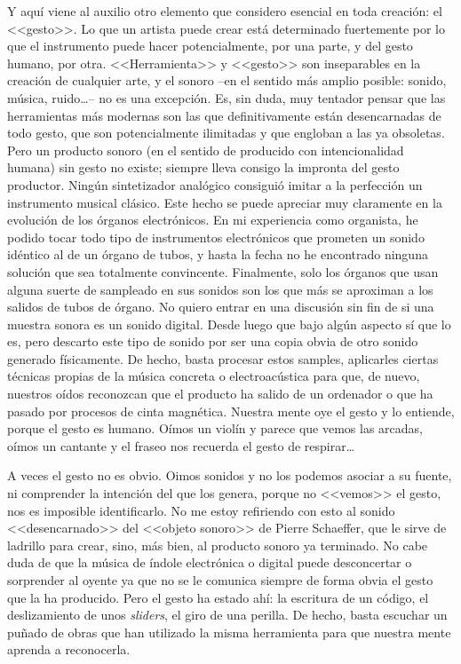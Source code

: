 Y aquí viene al auxilio otro elemento que considero esencial en toda creación: el <<gesto>>. Lo que un artista puede crear está determinado fuertemente por lo que el instrumento puede hacer potencialmente, por una parte, y del gesto humano, por  otra. <<Herramienta>> y <<gesto>> son inseparables en la creación de cualquier arte, y el sonoro --en el sentido más amplio posible: sonido, música, ruido\dots-- no es una excepción. Es, sin duda, muy tentador pensar que las herramientas más modernas son las que definitivamente están desencarnadas de todo gesto, que son potencialmente ilimitadas y que engloban a las ya obsoletas. Pero un producto sonoro (en el sentido de producido con intencionalidad humana) sin gesto no existe; siempre lleva consigo la impronta del gesto productor. Ningún sintetizador analógico consiguió imitar a la perfección un instrumento musical clásico. Este hecho se puede apreciar muy claramente en la evolución de los órganos electrónicos. En mi experiencia como organista, he podido tocar todo tipo de instrumentos electrónicos que prometen un sonido idéntico al de un órgano de tubos, y hasta la fecha no he encontrado ninguna solución que sea totalmente convincente. Finalmente, solo los órganos que usan alguna suerte de sampleado en sus sonidos son los que más se aproximan a los  salidos de tubos de órgano. No quiero entrar en una discusión sin fin de si una muestra sonora es un sonido digital. Desde luego que bajo algún aspecto sí que lo es, pero descarto este tipo de sonido por ser una copia obvia de otro sonido generado físicamente. De hecho, basta procesar estos samples, aplicarles ciertas técnicas propias de la música concreta o electroacústica para que, de nuevo, nuestros oídos reconozcan que el producto ha salido de un ordenador o que ha pasado por procesos de cinta magnética. Nuestra mente oye el gesto y lo entiende, porque el gesto es humano. Oímos un violín y parece que vemos las arcadas, oímos un cantante y el fraseo nos recuerda el gesto de respirar\dots 

A veces el gesto no es obvio. Oimos sonidos y no los podemos asociar a su fuente, ni comprender la intención del que los genera, porque no <<vemos>> el gesto, nos es imposible identificarlo. No me estoy refiriendo con esto al sonido <<desencarnado>> del <<objeto sonoro>> de Pierre Schaeffer, que le sirve de ladrillo para crear, sino, más bien, al producto sonoro ya terminado. No cabe duda de que la música de índole electrónica o digital puede desconcertar o sorprender al oyente ya que no se le comunica siempre de forma obvia el gesto que la ha producido. Pero el gesto ha estado ahí: la escritura de un código, el deslizamiento de unos \textit{sliders}, el giro de una perilla. De hecho, basta escuchar un puñado de obras que han utilizado la misma herramienta para que nuestra mente aprenda a reconocerla.

